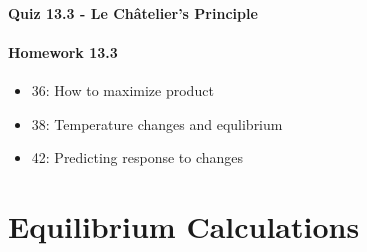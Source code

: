\documentclass[12pt, openany, letterpaper]{memoir}
\begin{document}
\paragraph*{Quiz 13.3 - Le Ch\^atelier's Principle}
\paragraph*{Homework 13.3}
\begin{itemize}
  \item 36: How to maximize product
  \item 38: Temperature changes and equlibrium
  \item 42: Predicting response to changes
\end{itemize}

\section{Equilibrium Calculations}
\end{document}
